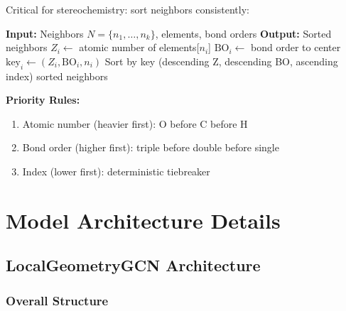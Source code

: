 \documentclass[11pt,a4paper]{article}
\begin{document}
Critical for stereochemistry: sort neighbors consistently:

\begin{algorithm}
\caption{Neighbor Sorting}
\begin{algorithmic}[1]
\State \textbf{Input:} Neighbors $N = \{n_1, \ldots, n_k\}$, elements, bond orders
\State \textbf{Output:} Sorted neighbors
\State
{}
    \State $Z_i \gets$ atomic number of elements[$n_i$]
    \State $\text{BO}_i \gets$ bond order to center
    \State $\text{key}_i \gets (Z_i, \text{BO}_i, n_i)$
\EndFor
\State
\State Sort by key (descending Z, descending BO, ascending index)
\State \Return sorted neighbors
\end{algorithmic}
\end{algorithm}

\textbf{Priority Rules:}
\begin{enumerate}
    \item Atomic number (heavier first): O before C before H
    \item Bond order (higher first): triple before double before single
    \item Index (lower first): deterministic tiebreaker
\end{enumerate}

\clearpage

\section{Model Architecture Details}

\subsection{LocalGeometryGCN Architecture}

\subsubsection{Overall Structure}
\end{document}
